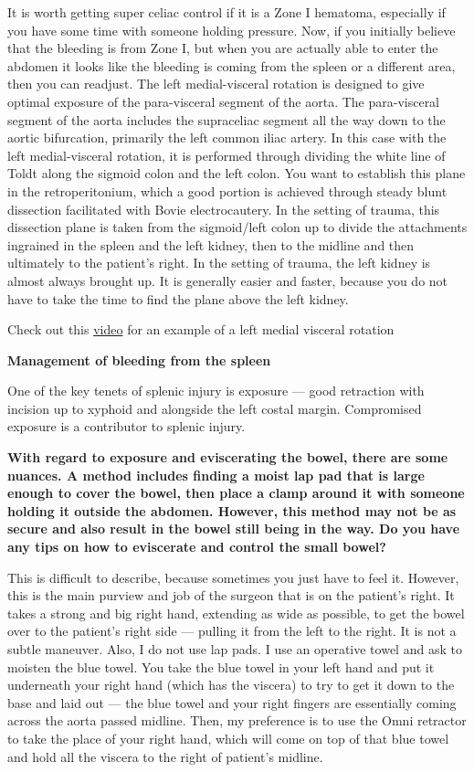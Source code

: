 \documentclass[
]{book}
\begin{document}
It is worth getting super celiac control if it is a Zone I hematoma,
especially if you have some time with someone holding pressure. Now, if
you initially believe that the bleeding is from Zone I, but when you are
actually able to enter the abdomen it looks like the bleeding is coming
from the spleen or a different area, then you can readjust. The left
medial-visceral rotation is designed to give optimal exposure of the
para-visceral segment of the aorta. The para-visceral segment of the
aorta includes the supraceliac segment all the way down to the aortic
bifurcation, primarily the left common iliac artery. In this case with
the left medial-visceral rotation, it is performed through dividing the
white line of Toldt along the sigmoid colon and the left colon. You want
to establish this plane in the retroperitonium, which a good portion is
achieved through steady blunt dissection facilitated with Bovie
electrocautery. In the setting of trauma, this dissection plane is taken
from the sigmoid/left colon up to divide the attachments ingrained in
the spleen and the left kidney, then to the midline and then ultimately
to the patient's right. In the setting of trauma, the left kidney is
almost always brought up. It is generally easier and faster, because you
do not have to take the time to find the plane above the left kidney.

Check out this \href{https://www.youtube.com/watch?v=DPxiDYzJwcY}{video} for an example of a left medial visceral rotation

\textbf{Management of bleeding from the spleen}

One of the key tenets of splenic injury is exposure --- good retraction with incision up to xyphoid and
alongside the left costal margin. Compromised exposure is a contributor to splenic injury.

\textbf{With regard to exposure and eviscerating the bowel, there are some
nuances. A method includes finding a moist lap pad that is large enough
to cover the bowel, then place a clamp around it with someone holding it
outside the abdomen. However, this method may not be as secure and also
result in the bowel still being in the way. Do you have any tips on how
to eviscerate and control the small bowel?}

This is difficult to describe, because sometimes you just have to feel
it. However, this is the main purview and job of the surgeon that is on
the patient's right. It takes a strong and big right hand, extending as
wide as possible, to get the bowel over to the patient's right side ---
pulling it from the left to the right. It is not a subtle maneuver.
Also, I do not use lap pads. I use an operative towel and ask to moisten
the blue towel. You take the blue towel in your left hand and put it
underneath your right hand (which has the viscera) to try to get it down
to the base and laid out --- the blue towel and your right fingers are
essentially coming across the aorta passed midline. Then, my preference
is to use the Omni retractor to take the place of your right hand, which
will come on top of that blue towel and hold all the viscera to the
right of patient's midline.
\end{document}
